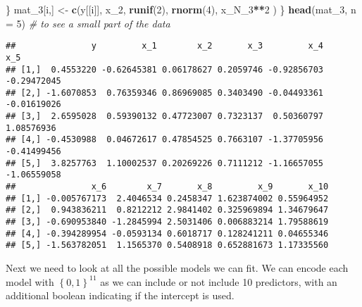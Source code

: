 \documentclass[
]{article}
\newenvironment{Shaded}{\begin{snugshade}}{\end{snugshade}}
\newcommand{\CommentTok}[1]{\textcolor[rgb]{0.56,0.35,0.01}{\textit{#1}}}
\newcommand{\DataTypeTok}[1]{\textcolor[rgb]{0.13,0.29,0.53}{#1}}
\newcommand{\DecValTok}[1]{\textcolor[rgb]{0.00,0.00,0.81}{#1}}
\newcommand{\KeywordTok}[1]{\textcolor[rgb]{0.13,0.29,0.53}{\textbf{#1}}}
\newcommand{\NormalTok}[1]{#1}
\newcommand{\OperatorTok}[1]{\textcolor[rgb]{0.81,0.36,0.00}{\textbf{#1}}}
\newcommand{\StringTok}[1]{\textcolor[rgb]{0.31,0.60,0.02}{#1}}
\begin{document}
\begin{Shaded}
\begin{Highlighting}[]
\NormalTok{  \}}
\NormalTok{  mat_}\DecValTok{3}\NormalTok{[i,] <-}\StringTok{ }\KeywordTok{c}\NormalTok{(y[[i]],}
\NormalTok{                 x_}\DecValTok{2}\NormalTok{,}
                 \KeywordTok{runif}\NormalTok{(}\DecValTok{2}\NormalTok{),}
                 \KeywordTok{rnorm}\NormalTok{(}\DecValTok{4}\NormalTok{),}
\NormalTok{                 x_N_}\DecValTok{3}\OperatorTok{**}\DecValTok{2}
\NormalTok{                 )}
\NormalTok{\}}
\KeywordTok{head}\NormalTok{(mat_}\DecValTok{3}\NormalTok{, }\DataTypeTok{n =} \DecValTok{5}\NormalTok{)  }\CommentTok{# to see a small part of the data}
\end{Highlighting}
\end{Shaded}

\begin{verbatim}
##               y         x_1        x_2       x_3         x_4         x_5
## [1,]  0.4553220 -0.62645381 0.06178627 0.2059746 -0.92856703 -0.29472045
## [2,] -1.6070853  0.76359346 0.86969085 0.3403490 -0.04493361 -0.01619026
## [3,]  2.6595028  0.59390132 0.47723007 0.7323137  0.50360797  1.08576936
## [4,] -0.4530988  0.04672617 0.47854525 0.7663107 -1.37705956 -0.41499456
## [5,]  3.8257763  1.10002537 0.20269226 0.7111212 -1.16657055 -1.06559058
##               x_6        x_7       x_8         x_9       x_10
## [1,] -0.005767173  2.4046534 0.2458347 1.623874002 0.55964952
## [2,]  0.943836211  0.8212212 2.9841402 0.325969894 1.34679647
## [3,] -0.690953840 -1.2845994 2.5031406 0.006883214 1.79588619
## [4,] -0.394289954 -0.0593134 0.6018717 0.128241211 0.04655346
## [5,] -1.563782051  1.1565370 0.5408918 0.652881673 1.17335560
\end{verbatim}

Next we need to look at all the possible models we can fit. We can
encode each model with \(\left\{0, 1\right\}^{11}\) as we can include or
not include 10 predictors, with an additional boolean indicating if the
intercept is used.
\end{document}
